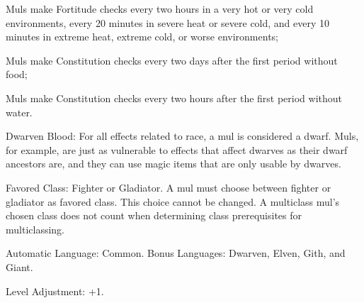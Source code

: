 \begin{itemize*}
\begin{itemize*}
        \item Muls make Fortitude checks every two hours in a very hot or very cold environments, every 20 minutes in severe heat or severe cold, and every 10 minutes in extreme heat, extreme cold, or worse environments;
        \item Muls make Constitution checks every two days after the first period without food;
        \item Muls make Constitution checks every two hours after the first period without water.
    \end{itemize*}
    \item Dwarven Blood: For all effects related to race, a mul is considered a dwarf. Muls, for example, are just as vulnerable to effects that affect dwarves as their dwarf ancestors are, and they can use magic items that are only usable by dwarves.
    \item Favored Class: Fighter or Gladiator. A mul must choose between fighter or gladiator as favored class. This choice cannot be changed. A multiclass mul's chosen class does not count when determining class prerequisites for multiclassing.
    \item Automatic Language: Common. Bonus Languages: Dwarven, Elven, Gith, and Giant.
    \item Level Adjustment: +1.
\end{itemize*}
